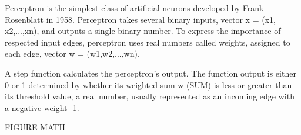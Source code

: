 Perceptron is the simplest class of artificial neurons developed by Frank Rosenblatt in 1958.\cite{perceptronprobabmodel} Perceptron takes several binary inputs, vector x = (x1, x2,...,xn), and outputs a single binary number. To express the importance of respected input edges, perceptron uses real numbers called weights, assigned to each edge, vector w = (w1,w2,...,wn).

A step function calculates the perceptron's output.
The function output is either 0 or 1 determined by whether its weighted sum w (SUM) is less or greater than its threshold value, a real number, usually represented as an incoming edge with a negative weight -1.

FIGURE 
MATH 
